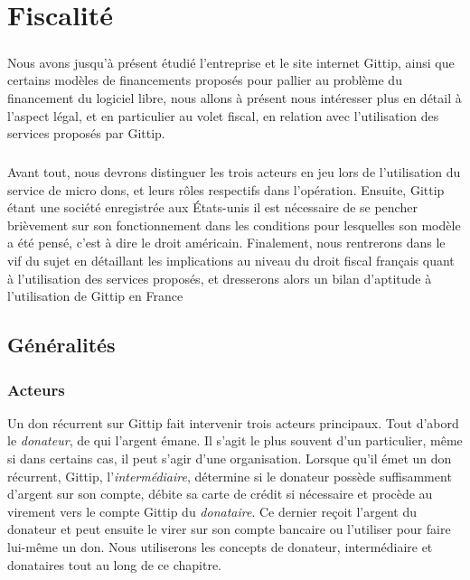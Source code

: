 \chapter{Fiscalité}\label{chapter3}
        \paragraph{}
            Nous avons jusqu'à présent étudié l'entreprise et le site
            internet Gittip, ainsi que certains modèles de financements
            proposés pour pallier au problème du financement du logiciel
            libre, nous allons à présent nous intéresser plus en détail
            à l'aspect légal, et en particulier au volet fiscal, en relation
            avec l'utilisation des services proposés par Gittip.
        \paragraph{}
            Avant tout, nous devrons distinguer les trois acteurs en jeu
            lors de l'utilisation du service de micro dons, et leurs rôles
            respectifs dans l'opération.
            Ensuite, Gittip étant une société enregistrée aux États-unis
            il est nécessaire de se pencher brièvement sur son fonctionnement
            dans les conditions pour lesquelles son modèle a été pensé,
            c'est à dire le droit américain.
            Finalement, nous rentrerons dans le vif du sujet en détaillant les
            implications au niveau du droit fiscal français quant à
            l'utilisation des services proposés, et dresserons alors un bilan
            d'aptitude à l'utilisation de Gittip en France

    \section{Généralités}
        \subsection{Acteurs}
            Un don récurrent sur Gittip fait intervenir trois acteurs
            principaux.
            Tout d'abord le \emph{donateur}, de qui l'argent émane.
            Il s'agit le plus souvent d'un particulier, même si dans
            certains cas, il peut s'agir d'une organisation.
            Lorsque qu'il émet un don récurrent, Gittip,
            l'\emph{intermédiaire}, détermine si
            le donateur possède suffisamment d'argent sur son compte,
            débite sa carte de crédit si nécessaire et procède au
            virement vers le compte Gittip du \emph{donataire}. Ce dernier
            reçoit l'argent du donateur et peut ensuite le virer sur son
            compte bancaire ou l'utiliser pour faire lui-même un don.
            Nous utiliserons les concepts de donateur, intermédiaire et
            donataires tout au long de ce chapitre.
